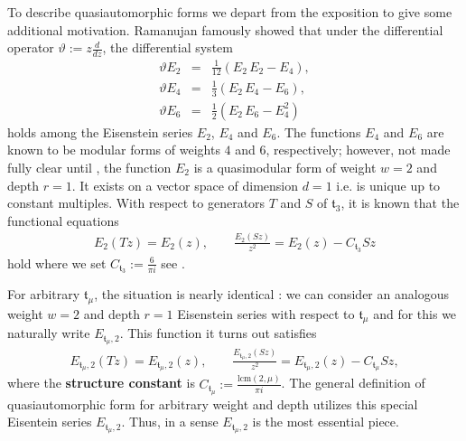 \documentclass[11pt]{article}
\begin{document}
To describe quasiautomorphic forms we depart from the exposition \cite{zemel2015} to give some additional motivation. Ramanujan famously showed that under the differential operator $ \vartheta := z \frac{d}{dz} $, the differential system 
    \begin{eqnarray*}
            \vartheta E_2 &=& \frac{1}{12}(E_2 \,E_2- E_4 ), \\
            \vartheta E_4 &=& \frac{1}{3}(E_2 \, E_4 - E_6), \\
            \vartheta E_6 &=& \frac{1}{2}(E_2 \, E_6 - E_4^2)    
    \end{eqnarray*}
holds among the Eisenstein series $ E_2 $, $ E_4 $ and $ E_6 $. The functions $ E_4 $ and $ E_6 $ are known to be modular forms of weights $ 4 $ and $ 6 $, respectively; however, not made fully clear until \cite{kanekoZagier1995}, the function $ E_2 $ is a quasimodular form of weight $ w = 2 $ and depth $ r = 1 $. It exists on a vector space of dimension $ d = 1 $ i.e. is unique up to constant multiples. With respect to generators $ T $ and $ S $ of $ \mathfrak{t}_3 $, it is known that the functional equations
    \begin{eqnarray}\label{eq:E2UnderS}
        E_2(Tz) = E_2(z), \qquad
        \frac{E_2(Sz)}{z^2} = E_2(z) - C_{\mathfrak{t}_3 }Sz 
    \end{eqnarray}
hold where we set $ C_{\mathfrak{t}_3} := \frac{6}{\pi i} $ see . 

For arbitrary $ \mathfrak{t}_\mu $, the situation is nearly identical  \cite{doranEtAl2013}: we can consider an analogous weight $ w = 2 $ and depth $ r = 1 $ Eisenstein series with respect to $\mathfrak{t}_\mu$ and for this we naturally write $ E_{\mathfrak{t}_\mu, 2} $. This function it turns out satisfies
    \begin{eqnarray}\label{eq:quasiAutoUnderTAndS}
        E_{\mathfrak{t}_\mu, 2}(Tz) = E_{\mathfrak{t}_\mu, 2}(z), \qquad
        \frac{E_{\mathfrak{t}_\mu, 2}(Sz)}{z^2} = E_{\mathfrak{t}_\mu, 2}(z) - C_{\mathfrak{t}_\mu }Sz, 
    \end{eqnarray}
where the \textbf{structure constant} is $ C_{\mathfrak{t}_\mu} := \frac{\text{lcm}(2, \mu)}{\pi i} $. The general definition of quasiautomorphic form for arbitrary weight and depth utilizes this special Eisentein series $ E_{\mathfrak{t}_\mu, 2} $. Thus, in a sense $ E_{\mathfrak{t}_\mu, 2} $ is the most essential piece. 
\end{document}
